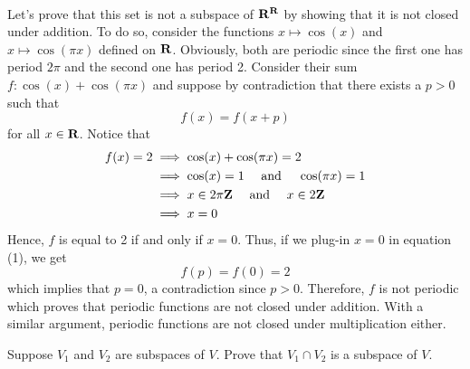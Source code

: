 \begin{solution}
    \\ Let's prove that this set is not a subspace of $\mathbf{R}^{\mathbf{R}}$ by showing that it is not closed under addition. To do so, consider the functions $x \mapsto \cos(x)$ and $x \mapsto \cos(\pi x)$ defined on $\mathbf{R}$. Obviously, both are periodic since the first one has period $2\pi$ and the second one has period 2. Consider their sum $f : \cos(x) + \cos(\pi x)$ and suppose by contradiction that there exists a $p > 0$ such that
    \[f(x) = f(x+p) \tag*{(1)}\]
    for all $x \in \mathbf{R}$. Notice that
    \begin{align*}
        f(x) = 2 &\implies \cos(x) + \cos(\pi x) = 2\\
        &\implies \cos(x) = 1 \quad \text{ and } \quad \cos(\pi x) = 1 \\
        &\implies x \in 2\pi \mathbf{Z} \quad \text{ and } \quad x \in 2 \mathbf{Z} \\
        &\implies x = 0
    \end{align*}
    Hence, $f$ is equal to 2 if and only if $x = 0$. Thus, if we plug-in $x = 0$ in equation (1), we get
    $$f(p) = f(0) = 2$$
    which implies that $p = 0$, a contradiction since $p > 0$. Therefore, $f$ is not periodic which proves that periodic functions are not closed under addition. With a similar argument, periodic functions are not closed under multiplication either. \\
\end{solution}

\begin{exercise}
    Suppose $V_1$ and $V_2$ are subspaces of $V$. Prove that $V_1 \cap V_2$ is a subspace of $V$. \\
\end{exercise}

